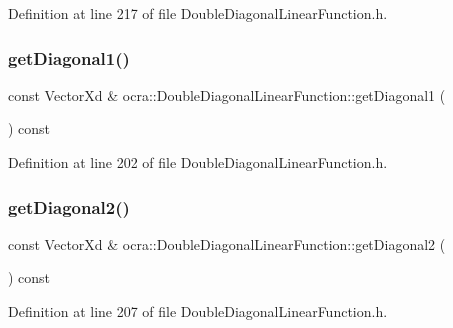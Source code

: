 Definition at line 217 of file Double\+Diagonal\+Linear\+Function.\+h.

\hypertarget{classocra_1_1DoubleDiagonalLinearFunction_a7d1cea2c8b94bc70854377779b49c966}{}\label{classocra_1_1DoubleDiagonalLinearFunction_a7d1cea2c8b94bc70854377779b49c966} 
\subsubsection{\texorpdfstring{get\+Diagonal1()}{getDiagonal1()}}
{\footnotesize\ttfamily const Vector\+Xd \& ocra\+::\+Double\+Diagonal\+Linear\+Function\+::get\+Diagonal1 (\begin{DoxyParamCaption}{ }\end{DoxyParamCaption}) const\hspace{0.3cm}{\ttfamily [inline]}}



Definition at line 202 of file Double\+Diagonal\+Linear\+Function.\+h.

\hypertarget{classocra_1_1DoubleDiagonalLinearFunction_a764b18fae37fa4dd6ecff2240c583a90}{}\label{classocra_1_1DoubleDiagonalLinearFunction_a764b18fae37fa4dd6ecff2240c583a90} 
\subsubsection{\texorpdfstring{get\+Diagonal2()}{getDiagonal2()}}
{\footnotesize\ttfamily const Vector\+Xd \& ocra\+::\+Double\+Diagonal\+Linear\+Function\+::get\+Diagonal2 (\begin{DoxyParamCaption}{ }\end{DoxyParamCaption}) const\hspace{0.3cm}{\ttfamily [inline]}}



Definition at line 207 of file Double\+Diagonal\+Linear\+Function.\+h.

\hypertarget{classocra_1_1DoubleDiagonalLinearFunction_a8a20ef8ec7347cdd86b630c33eed3e9e}{}\label{classocra_1_1DoubleDiagonalLinearFunction_a8a20ef8ec7347cdd86b630c33eed3e9e} 
